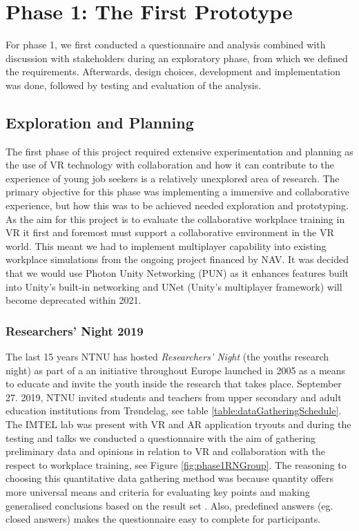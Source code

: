 
\chapter{Phase 1: The First Prototype}
\label{chap:phase1}

For phase 1, we first conducted a questionnaire and analysis combined with discussion with stakeholders during an exploratory phase, from which we defined the requirements. Afterwards, design choices, development and implementation was done, followed by testing and evaluation of the analysis.


\section{Exploration and Planning}
The first phase of this project required extensive experimentation and planning as the use of VR technology with collaboration and how it can contribute to the experience of young job seekers is a relatively unexplored area of research. The primary objective for this phase was implementing a immersive and collaborative experience, but how this was to be achieved needed exploration and prototyping. As the aim for this project is to evaluate the collaborative workplace training in VR it first and foremost must support a collaborative environment in the VR world. This meant we had to implement multiplayer capability into existing workplace simulations from the ongoing project financed by NAV. It was decided that we would use Photon Unity Networking (PUN) \cite{PUN} as it enhances features built into Unity's built-in networking and UNet (Unity's multiplayer framework) will become deprecated within 2021.  


\subsection{Researchers' Night 2019}
The last 15 years NTNU has hosted \textit{Researchers' Night} (the youths research night) as part of a an initiative throughout Europe launched in 2005 as a means to educate and invite the youth inside the research that takes place. September 27. 2019, NTNU invited students and teachers from upper secondary and adult education institutions from Trøndelag, see table \ref{table:dataGatheringSchedule}. The IMTEL lab was present with VR and AR application tryouts and during the testing and talks we conducted a questionnaire with the aim of gathering preliminary data and opinions in relation to VR and collaboration with the respect to workplace training, see Figure \ref{fig:phase1RNGroup}. The reasoning to choosing this quantitative data gathering method was because quantity offers more universal means and criteria for evaluating key points and making generalised conclusions based on the result set \cite{oates2005researching}. Also, predefined answers (eg. closed answers) makes the questionnaire easy to complete for participants.


